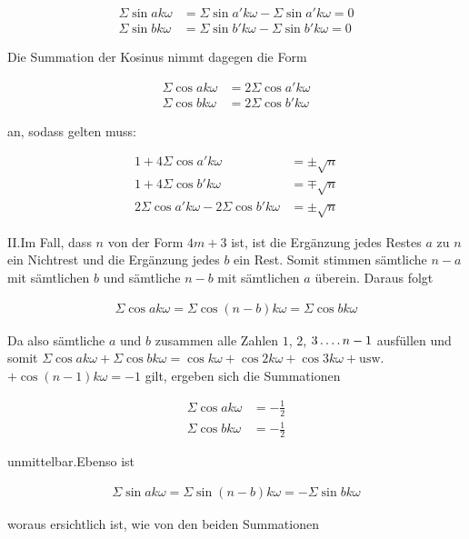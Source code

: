 \[
\begin{aligned}
\Sigma\sin ak\omega&=\Sigma\sin a'k\omega-\Sigma\sin a'k\omega=0\\
\Sigma\sin bk\omega&=\Sigma\sin b'k\omega-\Sigma\sin b'k\omega=0
\end{aligned}
\]

Die Summation der Kosinus nimmt dagegen die Form

\[
\begin{aligned}
\Sigma\cos ak\omega&=2\Sigma\cos a'k\omega\\
\Sigma\cos bk\omega&=2\Sigma\cos b'k\omega
\end{aligned}
\]

an, sodass gelten muss:

\[
\begin{aligned}
1+4\Sigma\cos a'k\omega&=\pm\surd n\\
1+4\Sigma\cos b'k\omega&=\mp\surd n\\
2\Sigma\cos a'k\omega-2\Sigma\cos b'k\omega&=\pm\surd n
\end{aligned}
\]

II.\quad Im Fall, dass $n$ von der Form $4m+3$ ist, ist die Ergänzung jedes Restes $a$ zu $n$ ein Nichtrest und die Ergänzung jedes $b$ ein Rest. Somit stimmen sämtliche $n-a$ mit sämtlichen $b$ und sämtliche $n-b$ mit sämtlichen $a$ überein. Daraus folgt

\[
\begin{aligned}
\Sigma\cos ak\omega=\Sigma\cos(n-b)k\omega=\Sigma\cos bk\omega
\end{aligned}
\]

Da also sämtliche $a$ und $b$ zusammen alle Zahlen $1$, $2$, $3\mathinner{.\,.\,.\,.} n-1$ ausfüllen und somit $\Sigma\cos ak\omega+\Sigma\cos bk\omega=\cos k\omega+\cos2k\omega+\cos3k\omega+\text{usw.}$ $+\cos(n-1)k\omega=-1$ gilt, ergeben sich die Summationen

\[
\begin{aligned}
\Sigma\cos ak\omega&=-\tfrac12\\
\Sigma\cos bk\omega&=-\tfrac12
\end{aligned}
\]

unmittelbar.\quad Ebenso ist

\[
\begin{aligned}
\Sigma\sin ak\omega=\Sigma\sin(n-b)k\omega=-\Sigma\sin bk\omega
\end{aligned}
\]

woraus ersichtlich ist, wie von den beiden Summationen

